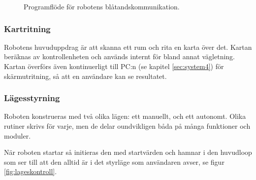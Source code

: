 \documentclass[a4paper,11pt]{article}
\begin{document}
\begin{figure}[h!]
\begin{tikzpicture}[node distance=2cm,scale=0.6, every node/.style={scale=0.6}]
    \end{tikzpicture}
    \caption{Programflöde för robotens blåtandskommunikation.}
    \label{fig:bluetooth}
\end{figure}

\subsubsection{Kartritning} \label{sssec:mapping}
Robotens huvuduppdrag är att skanna ett rum och rita en karta över det. Kartan beräknas av kontrollenheten och används internt för bland annat vägletning. Kartan överförs även kontinuerligt till PC:n (se kapitel \ref{sec:system4}) för skärmutritning, så att en användare kan se resultatet.

\subsubsection{Lägesstyrning}
Roboten konstrueras med två olika lägen: ett manuellt, och ett autonomt. Olika rutiner skrivs för varje, men de delar oundvikligen båda på många funktioner och moduler.

När roboten startar så initieras den med startvärden och hamnar i den huvudloop som ser till att den alltid är i det styrläge som användaren avser, se figur \ref{fig:lageskontroll}.
\end{document}
